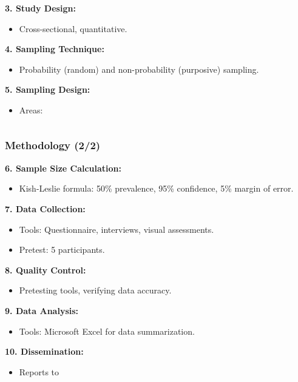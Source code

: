\begin{frame}[shrink=30]
\begin{columns}
\begin{column}{0.6\textwidth}
            
            \textbf{3. Study Design:}
            \begin{itemize}
                \item Cross-sectional, quantitative.
            \end{itemize}
            
            \textbf{4. Sampling Technique:}
            \begin{itemize}
                \item Probability (random) and non-probability (purposive) sampling.
            \end{itemize}
            
            \textbf{5. Sampling Design:}
            \begin{itemize}
                \item Areas: 
            \end{itemize}
        \end{column}
    \end{columns}
\end{frame}
    
    
    


    \begin{frame}[shrink=20]
        \frametitle{Methodology (2/2)}
        \textbf{6. Sample Size Calculation:}
        \begin{itemize}
            \item Kish-Leslie formula: 50\% prevalence, 95\% confidence, 5\% margin of error.
        \end{itemize}
        
        \textbf{7. Data Collection:}
        \begin{itemize}
            \item Tools: Questionnaire, interviews, visual assessments.
            \item Pretest: 5 participants.
        \end{itemize}
        
        \textbf{8. Quality Control:}
        \begin{itemize}
            \item Pretesting tools, verifying data accuracy.
        \end{itemize}
        
        \textbf{9. Data Analysis:}
        \begin{itemize}
            \item Tools: Microsoft Excel for data summarization.
        \end{itemize}
        
        \textbf{10. Dissemination:}
        \begin{itemize}
            \item Reports to 
        \end{itemize}
\end{frame}
        
    


